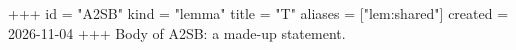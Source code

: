 +++
id = "A2SB"
kind = "lemma"
title = "T"
aliases = ["lem:shared"]
created = 2026-11-04
+++
Body of A2SB: a made-up statement.
